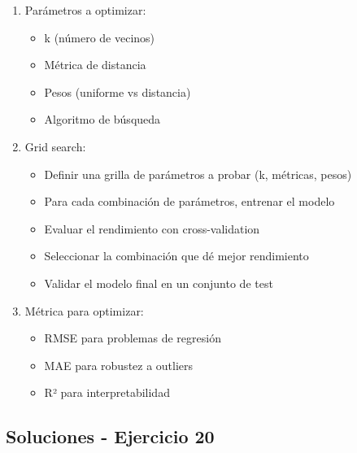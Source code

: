 \documentclass[12pt]{article}
\begin{document}
\begin{enumerate}
    \item Parámetros a optimizar:
    \begin{itemize}
        \item k (número de vecinos)
        \item Métrica de distancia
        \item Pesos (uniforme vs distancia)
        \item Algoritmo de búsqueda
    \end{itemize}
    \item Grid search:
    \begin{itemize}
        \item Definir una grilla de parámetros a probar (k, métricas, pesos)
        \item Para cada combinación de parámetros, entrenar el modelo
        \item Evaluar el rendimiento con cross-validation
        \item Seleccionar la combinación que dé mejor rendimiento
        \item Validar el modelo final en un conjunto de test
    \end{itemize}
    \item Métrica para optimizar:
    \begin{itemize}
        \item RMSE para problemas de regresión
        \item MAE para robustez a outliers
        \item R² para interpretabilidad
    \end{itemize}
\end{enumerate}

\subsection{Soluciones - Ejercicio 20}
\end{document}
